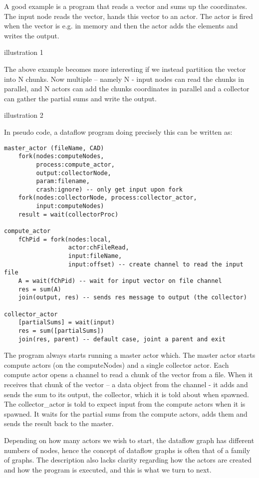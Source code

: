\documentclass[11pt,a4paper]{article}
\begin{document}
\begin{Example}

A good example is a program that reads a vector and sums up the coordinates.  The input node reads the vector, hands this vector to an actor.  The actor is fired when the vector is e.g. in memory and then the actor adds the elements and writes the output.

illustration 1

The above example becomes more interesting if we instead partition the vector into N chunks. Now multiple – namely N - input nodes can read the chunks in parallel, and N actors can add the chunks coordinates in parallel and a collector can gather the partial sums and write the output.  

illustration 2

In pseudo code, a dataflow program doing precisely this can be written as:
\begin{lstlisting}
master_actor (fileName, CAD)
    fork(nodes:computeNodes, 
         process:compute_actor, 
         output:collectorNode, 
         param:filename, 
         crash:ignore) -- only get input upon fork
    fork(nodes:collectorNode, process:collector_actor, 
         input:computeNodes)
    result = wait(collectorProc)

compute_actor
    fChPid = fork(nodes:local, 
                  actor:chFileRead, 
                  input:fileName, 
                  input:offset) -- create channel to read the input file
    A = wait(fChPid) -- wait for input vector on file channel
    res = sum(A)
    join(output, res) -- sends res message to output (the collector)
 
collector_actor
    [partialSums] = wait(input)
    res = sum([partialSums])
    join(res, parent) -- default case, joint a parent and exit
\end{lstlisting}

The program always starts running a master actor which. The master
actor starts compute actors (on the computeNodes) and a single
collector actor. Each compute actor opens a channel to read a chunk of
the vector from a file. When it receives that chunk of the vector – a
data object from the channel - it adds and sends the sum to its
output, the collector, which it is told about when spawned.  The
collector\_actor is told to expect input from the compute actors when
it is spawned. It waits for the partial sums from the compute actors,
adds them and sends the result back to the master.

Depending on how many actors we wish to start, the dataflow graph has
different numbers of nodes, hence the concept of dataflow graphs is
often that of a family of graphs.  The description also lacks clarity
regarding how the actors are created and how the program is executed,
and this is what we turn to next.

\end{Example}
\end{document}
